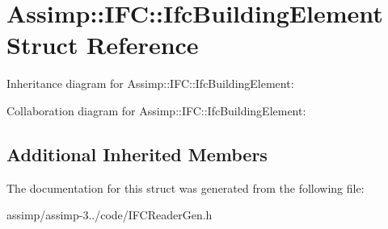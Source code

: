 \hypertarget{struct_assimp_1_1_i_f_c_1_1_ifc_building_element}{\section{Assimp\+:\+:I\+F\+C\+:\+:Ifc\+Building\+Element Struct Reference}
\label{struct_assimp_1_1_i_f_c_1_1_ifc_building_element}
}


Inheritance diagram for Assimp\+:\+:I\+F\+C\+:\+:Ifc\+Building\+Element\+:


Collaboration diagram for Assimp\+:\+:I\+F\+C\+:\+:Ifc\+Building\+Element\+:
\subsection*{Additional Inherited Members}


The documentation for this struct was generated from the following file\+:\begin{DoxyCompactItemize}
\item 
assimp/assimp-\/3../code/I\+F\+C\+Reader\+Gen.\+h\end{DoxyCompactItemize}
